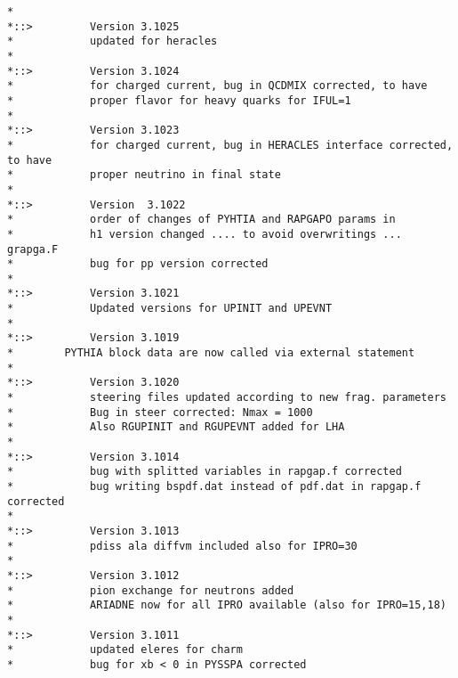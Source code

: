 \documentclass[10pt]{article} \usepackage{dina4}
\begin{document}
\begin{verbatim}
*
*::>         Version 3.1025
*            updated for heracles 
*
*::>         Version 3.1024
*            for charged current, bug in QCDMIX corrected, to have
*            proper flavor for heavy quarks for IFUL=1
*
*::>         Version 3.1023  
*            for charged current, bug in HERACLES interface corrected, to have
*            proper neutrino in final state
*
*::>         Version  3.1022
*            order of changes of PYHTIA and RAPGAPO params in  
*            h1 version changed .... to avoid overwritings ... grapga.F
*            bug for pp version corrected
*
*::>         Version 3.1021
*            Updated versions for UPINIT and UPEVNT 
*
*::>         Version 3.1019
* 		 PYTHIA block data are now called via external statement
*
*::>         Version 3.1020
*            steering files updated according to new frag. parameters
*            Bug in steer corrected: Nmax = 1000
*            Also RGUPINIT and RGUPEVNT added for LHA
*
*::>         Version 3.1014
*            bug with splitted variables in rapgap.f corrected
*            bug writing bspdf.dat instead of pdf.dat in rapgap.f corrected
*
*::>         Version 3.1013
*            pdiss ala diffvm included also for IPRO=30
*
*::>         Version 3.1012
*            pion exchange for neutrons added
*            ARIADNE now for all IPRO available (also for IPRO=15,18)
*
*::>         Version 3.1011
*            updated eleres for charm 
*            bug for xb < 0 in PYSSPA corrected


\end{verbatim}
\end{document}
